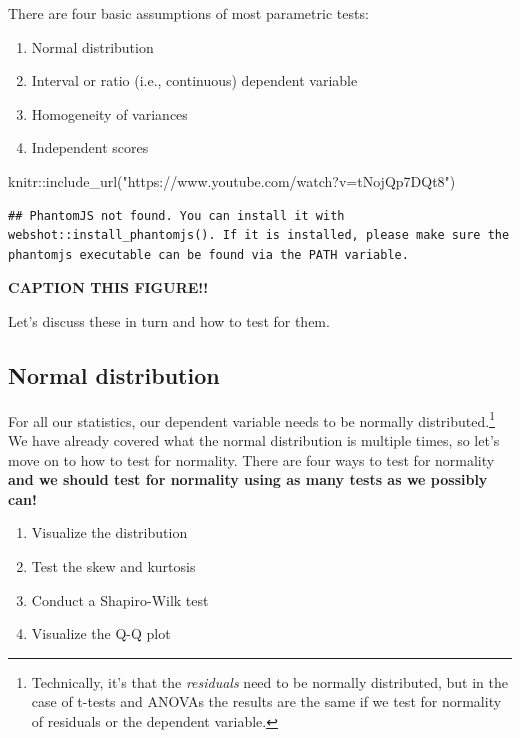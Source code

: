 \documentclass[
]{book}
\newenvironment{Shaded}{\begin{snugshade}}{\end{snugshade}}
\newcommand{\FunctionTok}[1]{\textcolor[rgb]{0.00,0.00,0.00}{#1}}
\newcommand{\NormalTok}[1]{#1}
\newcommand{\SpecialCharTok}[1]{\textcolor[rgb]{0.00,0.00,0.00}{#1}}
\newcommand{\StringTok}[1]{\textcolor[rgb]{0.31,0.60,0.02}{#1}}
\providecommand{\tightlist}{%
  \setlength{\itemsep}{0pt}\setlength{\parskip}{0pt}}
\begin{document}
There are four basic assumptions of most parametric tests:

\begin{enumerate}
\def\labelenumi{\arabic{enumi}.}
\tightlist
\item
  Normal distribution
\item
  Interval or ratio (i.e., continuous) dependent variable
\item
  Homogeneity of variances
\item
  Independent scores
\end{enumerate}

\begin{Shaded}
\begin{Highlighting}[]
\NormalTok{knitr}\SpecialCharTok{::}\FunctionTok{include\_url}\NormalTok{(}\StringTok{"https://www.youtube.com/watch?v=tNojQp7DQt8"}\NormalTok{)}
\end{Highlighting}
\end{Shaded}

\begin{verbatim}
## PhantomJS not found. You can install it with webshot::install_phantomjs(). If it is installed, please make sure the phantomjs executable can be found via the PATH variable.
\end{verbatim}

\label{fig:unnamed-chunk-1}\textbf{CAPTION THIS FIGURE!!}

Let's discuss these in turn and how to test for them.

\hypertarget{normal-distribution-1}{%
\subsection{Normal distribution}\label{normal-distribution-1}}

For all our statistics, our dependent variable needs to be normally distributed.\footnote{Technically, it's that the \emph{residuals} need to be normally distributed, but in the case of t-tests and ANOVAs the results are the same if we test for normality of residuals or the dependent variable.} We have already covered what the normal distribution is multiple times, so let's move on to how to test for normality. There are four ways to test for normality \textbf{and we should test for normality using as many tests as we possibly can!}

\begin{enumerate}
\def\labelenumi{\arabic{enumi}.}
\tightlist
\item
  Visualize the distribution
\item
  Test the skew and kurtosis
\item
  Conduct a Shapiro-Wilk test
\item
  Visualize the Q-Q plot
\end{enumerate}
\end{document}
